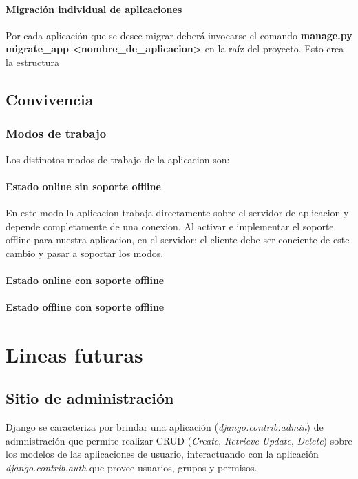 \documentclass[a4paper]{report}
\begin{document}
\subsubsection{Migración individual de aplicaciones}
Por cada aplicación que se desee migrar deberá invocarse el comando 
\textbf{manage.py migrate\_app <nombre_de_aplicacion>} en la raíz del proyecto.
Esto crea la estructura 
 
\section{Convivencia}

\subsection{Modos de trabajo}
Los distinotos modos de trabajo de la aplicacion son:
\subsubsection{Estado online sin soporte offline}
En este modo la aplicacion trabaja directamente sobre el servidor de aplicacion
y depende completamente de una conexion.
Al activar e implementar el soporte offline para nuestra aplicacion, en el
servidor; el cliente debe ser conciente de este cambio y pasar a soportar los
modos.
\subsubsection{Estado online con soporte offline}
\subsubsection{Estado offline con soporte offline}

\chapter{Lineas futuras}
\section{Sitio de administración}
Django se caracteriza por brindar una aplicación (\textit{django.contrib.admin})
de admnistración que permite realizar CRUD (\textit{Create}, \textit{Retrieve}
\textit{Update}, \textit{Delete}) sobre los modelos de las aplicaciones de
usuario, interactuando con la aplicación \textit{django.contrib.auth} que provee
usuarios, grupos y permisos.
 
\end{document}
